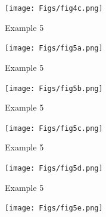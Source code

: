 \documentclass[12pt]{article}
\newcommand{\headsize}{\fontsize{35}{35} \selectfont}
\begin{document}
\vspace{30mm}

\centerline{\texttt{[image: Figs/fig4c.png]}}



\newpage


\headsize \color{myyellow}
\hfill \begin{minipage}{5.75in}
\centering
Example 5
\end{minipage}

\vspace{30mm}

\centerline{\texttt{[image: Figs/fig5a.png]}}




\newpage


\headsize \color{myyellow}
\hfill \begin{minipage}{5.75in}
\centering
Example 5
\end{minipage}

\vspace{30mm}

\centerline{\texttt{[image: Figs/fig5b.png]}}



\newpage


\headsize \color{myyellow}
\hfill \begin{minipage}{5.75in}
\centering
Example 5
\end{minipage}

\vspace{30mm}

\centerline{\texttt{[image: Figs/fig5c.png]}}


\newpage


\headsize \color{myyellow}
\hfill \begin{minipage}{5.75in}
\centering
Example 5
\end{minipage}

\vspace{30mm}

\centerline{\texttt{[image: Figs/fig5d.png]}}


\newpage


\headsize \color{myyellow}
\hfill \begin{minipage}{5.75in}
\centering
Example 5
\end{minipage}

\vspace{30mm}

\centerline{\texttt{[image: Figs/fig5e.png]}}


\newpage
\end{document}

